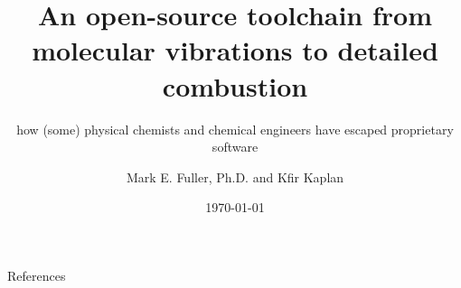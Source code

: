 \documentclass[10pt,presentation]{beamer}
\title[Chemistry free software toolchain]{An open-source toolchain from molecular vibrations to detailed combustion}
\subtitle{how (some) physical chemists and chemical engineers have escaped proprietary software}
\author[Fuller \& Kaplan]{Mark E. Fuller, Ph.D. and Kfir Kaplan}
\institute{LibrePlanet 2022}
\date[20 March 2022]{\today}
\begin{document}


\begin{frame}{References}
\printbibliography 
\end{frame}
\end{document}
